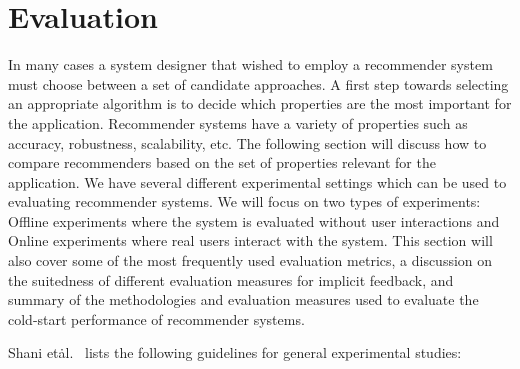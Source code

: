 
\label{evaluation}
\section{Evaluation}





In many cases a system designer that wished to employ a recommender system must
choose between a set of candidate approaches. A first step towards selecting an
appropriate algorithm is to decide which properties are the most important for
the application. Recommender systems have a variety of properties such as
accuracy, robustness, scalability, etc. The following section will discuss how
to compare recommenders based on the set of properties  relevant for the
application. We have several different experimental settings which can be used
to evaluating recommender systems. We will focus on two types of experiments:
Offline experiments where the system is evaluated without user interactions and
Online experiments where real users interact with the system. This section will
also cover some of the most frequently used evaluation metrics, a discussion on
the suitedness of different evaluation measures for implicit feedback, and
summary of the methodologies and evaluation measures used to evaluate the
cold-start performance of recommender systems.

Shani et\. al.\ \cite{Shani2011} lists the following guidelines for general experimental
studies:

